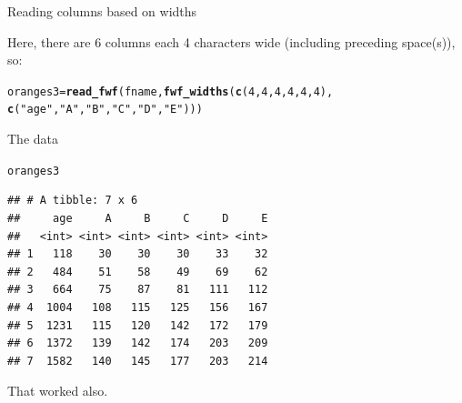 \documentclass[unknownkeysallowed]{beamer}\usepackage[]{graphicx}\usepackage[]{color}
\makeatletter
\newcommand{\hlnum}[1]{\textcolor[rgb]{0.686,0.059,0.569}{#1}}%
\newcommand{\hlstr}[1]{\textcolor[rgb]{0.192,0.494,0.8}{#1}}%
\newcommand{\hlstd}[1]{\textcolor[rgb]{0.345,0.345,0.345}{#1}}%
\newcommand{\hlkwb}[1]{\textcolor[rgb]{0.69,0.353,0.396}{#1}}%
\newcommand{\hlkwd}[1]{\textcolor[rgb]{0.737,0.353,0.396}{\textbf{#1}}}%
\newenvironment{kframe}{%
 \def\at@end@of@kframe{}%
 \ifinner\ifhmode%
  \def\at@end@of@kframe{\end{minipage}}%
  \begin{minipage}{\columnwidth}%
 \fi\fi%
 \def\FrameCommand##1{\hskip\@totalleftmargin \hskip-\fboxsep
 \colorbox{shadecolor}{##1}\hskip-\fboxsep
     \hskip-\linewidth \hskip-\@totalleftmargin \hskip\columnwidth}%
 \MakeFramed {\advance\hsize-\width
   \@totalleftmargin\z@ \linewidth\hsize
   \@setminipage}}%
 {\par\unskip\endMakeFramed%
 \at@end@of@kframe}
\newenvironment{knitrout}{}{} %
\makeatother
\begin{document}
\begin{frame}[fragile]{Reading columns based on widths}
  
  Here, there are 6 columns each 4 characters wide (including
  preceding space(s)), so:
  
\begin{knitrout}
\color{fgcolor}\begin{kframe}
\begin{alltt}
\hlstd{oranges3}\hlkwb{=}\hlkwd{read_fwf}\hlstd{(fname,}\hlkwd{fwf_widths}\hlstd{(}\hlkwd{c}\hlstd{(}\hlnum{4}\hlstd{,}\hlnum{4}\hlstd{,}\hlnum{4}\hlstd{,}\hlnum{4}\hlstd{,}\hlnum{4}\hlstd{,}\hlnum{4}\hlstd{),}
           \hlkwd{c}\hlstd{(}\hlstr{"age"}\hlstd{,}\hlstr{"A"}\hlstd{,}\hlstr{"B"}\hlstd{,}\hlstr{"C"}\hlstd{,}\hlstr{"D"}\hlstd{,}\hlstr{"E"}\hlstd{)))}
\end{alltt}


{\ttfamily\noindent\itshape\color{messagecolor}{\#\# Parsed with column specification:\\\#\# cols(\\\#\#\ \  age = col\_integer(),\\\#\#\ \  A = col\_integer(),\\\#\#\ \  B = col\_integer(),\\\#\#\ \  C = col\_integer(),\\\#\#\ \  D = col\_integer(),\\\#\#\ \  E = col\_integer()\\\#\# )}}\end{kframe}
\end{knitrout}
  
\end{frame}

\begin{frame}[fragile]{The data}
  
\begin{knitrout}
\color{fgcolor}\begin{kframe}
\begin{alltt}
\hlstd{oranges3}
\end{alltt}
\begin{verbatim}
## # A tibble: 7 x 6
##     age     A     B     C     D     E
##   <int> <int> <int> <int> <int> <int>
## 1   118    30    30    30    33    32
## 2   484    51    58    49    69    62
## 3   664    75    87    81   111   112
## 4  1004   108   115   125   156   167
## 5  1231   115   120   142   172   179
## 6  1372   139   142   174   203   209
## 7  1582   140   145   177   203   214
\end{verbatim}
\end{kframe}
\end{knitrout}

That worked also.
  
\end{frame}
\end{document}
